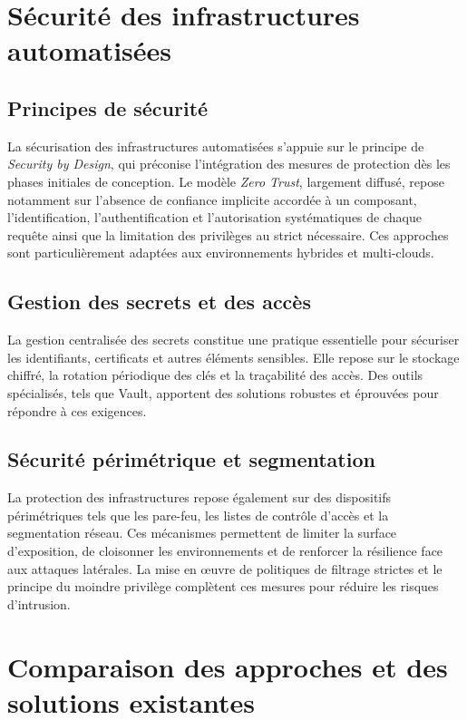 \section{Sécurité des infrastructures automatisées}

\subsection{Principes de sécurité}

La sécurisation des infrastructures automatisées s’appuie sur le principe de \emph{Security by Design}, qui préconise l’intégration des mesures de protection dès les phases initiales de conception. Le modèle \emph{Zero Trust}, largement diffusé, repose notamment sur l’absence de confiance implicite accordée à un composant, l'identification, l’authentification et l’autorisation systématiques de chaque requête ainsi que la limitation des privilèges au strict nécessaire. Ces approches sont particulièrement adaptées aux environnements hybrides et multi-clouds.

\subsection{Gestion des secrets et des accès}

La gestion centralisée des secrets constitue une pratique essentielle pour sécuriser les identifiants, certificats et autres éléments sensibles. Elle repose sur le stockage chiffré, la rotation périodique des clés et la traçabilité des accès. Des outils spécialisés, tels que Vault, apportent des solutions robustes et éprouvées pour répondre à ces exigences.

\subsection{Sécurité périmétrique et segmentation}

La protection des infrastructures repose également sur des dispositifs périmétriques tels que les pare-feu, les listes de contrôle d’accès et la segmentation réseau. Ces mécanismes permettent de limiter la surface d’exposition, de cloisonner les environnements et de renforcer la résilience face aux attaques latérales. La mise en œuvre de politiques de filtrage strictes et le principe du moindre privilège complètent ces mesures pour réduire les risques d’intrusion.

\section{Comparaison des approches et des solutions existantes}


